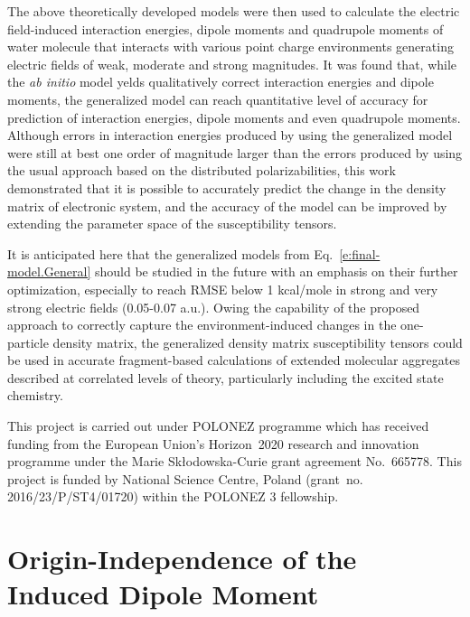 \documentclass[aip,amsmath,amssymb,reprint]{revtex4-1}
\begin{document}
The above theoretically developed models were then used to calculate the electric field\hyp{}induced
interaction energies, dipole moments and quadrupole moments of water molecule that
interacts with various point charge environments generating electric fields of weak, moderate
and strong magnitudes. It was found that, while the \emph{ab initio} model yelds qualitatively correct
interaction energies and dipole moments, the generalized model can reach quantitative level of accuracy
for prediction of interaction energies, dipole moments and even quadrupole moments. Although 
errors in interaction energies produced by using the generalized model 
were still at best one order of magnitude larger than the errors produced by using the
usual approach based on the distributed polarizabilities, this work demonstrated that it is possible to
accurately predict the change in the density matrix of electronic system, and the accuracy of the model
can be improved by extending the parameter space of the susceptibility tensors. 

It is anticipated here that the generalized models from Eq.~\eqref{e:final-model.General}
should be studied in the future with an emphasis 
on their further optimization, especially to reach RMSE below 1 kcal/mole
in strong and very strong electric fields (0.05-0.07 a.u.). 
Owing the capability of the proposed approach to correctly capture the 
environment\hyp{}induced changes in the one\hyp{}particle density matrix, 
the generalized density matrix susceptibility tensors 
could be used in accurate fragment\hyp{}based calculations of extended molecular aggregates
described at correlated levels of theory, particularly including the excited state chemistry.

\begin{acknowledgments}
This project is carried out under POLONEZ programme which has received funding from the European Union's
Horizon~2020 research and innovation programme under the Marie Skłodowska-Curie grant agreement 
No.~665778. This project is funded by National Science Centre, Poland 
(grant~no. 2016/23/P/ST4/01720) within the POLONEZ 3 fellowship.
\end{acknowledgments}

%
\appendix

\section{\label{a:orig-dep} Origin-Independence of the Induced Dipole Moment}
\end{document}
